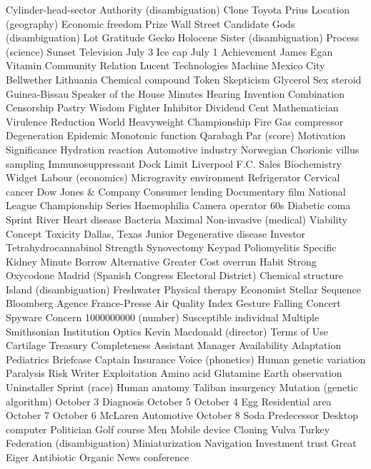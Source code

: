 Cylinder-head-sector  Authority (disambiguation)  Clone  
Toyota Prius  Location (geography)  Economic freedom  
Prize  Wall Street  Candidate  
Gods (disambiguation)  Lot  Gratitude  
Gecko  Holocene  Sister (disambiguation)  
Process (science)  Sunset  Television  
July 3  Ice cap  July 1  
Achievement  James Egan  Vitamin  
Community  Relation  Lucent Technologies  
Machine  Mexico City  Bellwether  
Lithuania  Chemical compound  Token  
Skepticism  Glycerol  Sex steroid  
Guinea-Bissau  Speaker of the House  Minutes  
Hearing  Invention  Combination  
Censorship  Pastry  Wisdom  
Fighter  Inhibitor  Dividend  
Cent  Mathematician  Virulence  
Reduction  World Heavyweight Championship  Fire  
Gas compressor  Degeneration  Epidemic  
Monotonic function  Qarabagh  Par (score)  
Motivation  Significance  Hydration reaction  
Automotive industry  Norwegian  Chorionic villus sampling  
Immunosuppressant  Dock  Limit  
Liverpool F.C.  Sales  Biochemistry  
Widget  Labour (economics)  Microgravity environment  
Refrigerator  Cervical cancer  Dow Jones & Company  
Consumer lending  Documentary film  National League Championship Series  
Haemophilia  Camera operator  60s  
Diabetic coma  Sprint  River  
Heart disease  Bacteria  Maximal  
Non-invasive (medical)  Viability  Concept  
Toxicity  Dallas, Texas  Junior  
Degenerative disease  Investor  Tetrahydrocannabinol  
Strength  Synovectomy  Keypad  
Poliomyelitis  Specific  Kidney  
Minute  Borrow  Alternative  
Greater  Cost overrun  Habit  
Strong  Oxycodone  Madrid (Spanish Congress Electoral District)  
Chemical structure  Island (disambiguation)  Freshwater  
Physical therapy  Economist  Stellar  
Sequence  Bloomberg  Agence France-Presse  
Air Quality Index  Gesture  Falling  
Concert  Spyware  Concern  
1000000000 (number)  Susceptible individual  Multiple  
Smithsonian Institution  Optics  Kevin Macdonald (director)  
Terms of Use  Cartilage  Treasury  
Completeness  Assistant Manager  Availability  
Adaptation  Pediatrics  Briefcase  
Captain  Insurance  Voice (phonetics)  
Human genetic variation  Paralysis  Risk  
Writer  Exploitation  Amino acid  
Glutamine  Earth observation  Uninstaller  
Sprint (race)  Human anatomy  Taliban insurgency  
Mutation (genetic algorithm)  October 3  Diagnosis  
October 5  October 4  Egg  
Residential area  October 7  October 6  
McLaren Automotive  October 8  Soda  
Predecessor  Desktop computer  Politician  
Golf course  Men  Mobile device  
Cloning  Vulva  Turkey  
Federation (disambiguation)  Miniaturization  Navigation  
Investment trust  Great  Eiger  
Antibiotic  Organic  News conference  
